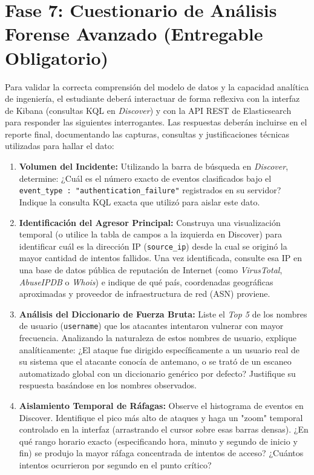 \documentclass[
  coursetitle={Cómputo Nube y Tecnologías Emergentes},
  coursehours={96},
  coursedate={Verano 2026},
  doctype={Práctica},
  otherlangs={english,french},
  authorname={Lázaro},
  authorsurname={Bustio-Martínez},
  authortitle={PhD},
  role={Profesor Investigador},
  email={lbustio@inaoe.mx},
  phone={5559504000},
  ext={7459},
  institution={Instituto Nacional de Astrofísica, Óptica y Electrónica (INAOE)},
  department={Maestría en Ciencias en Tecnologías de Seguridad},
  address={Luis Enrique Erro 1, Sta. Ma. Tonantzintla, San Andrés Cholula, CP 72840, Puebla, México},
  margin={0.5in}
]{../../lbustio_lecture_notes}
\begin{document}
\section{Fase 7: Cuestionario de Análisis Forense Avanzado (Entregable Obligatorio)}

Para validar la correcta comprensión del modelo de datos y la capacidad analítica de ingeniería, el estudiante deberá interactuar de forma reflexiva con la interfaz de Kibana (consultas KQL en \textit{Discover}) y con la API REST de Elasticsearch para responder las siguientes interrogantes. Las respuestas deberán incluirse en el reporte final, documentando las capturas, consultas y justificaciones técnicas utilizadas para hallar el dato:

\begin{enumerate}
    \item \textbf{Volumen del Incidente:} Utilizando la barra de búsqueda en \textit{Discover}, determine: ¿Cuál es el número exacto de eventos clasificados bajo el \texttt{event\_type : "authentication\_failure"} registrados en su servidor? Indique la consulta KQL exacta que utilizó para aislar este dato.
    
    \item \textbf{Identificación del Agresor Principal:} Construya una visualización temporal (o utilice la tabla de campos a la izquierda en Discover) para identificar cuál es la dirección IP (\texttt{source\_ip}) desde la cual se originó la mayor cantidad de intentos fallidos. Una vez identificada, consulte esa IP en una base de datos pública de reputación de Internet (como \textit{VirusTotal}, \textit{AbuseIPDB} o \textit{Whois}) e indique de qué país, coordenadas geográficas aproximadas y proveedor de infraestructura de red (ASN) proviene.
    
    \item \textbf{Análisis del Diccionario de Fuerza Bruta:} Liste el \textit{Top 5} de los nombres de usuario (\texttt{username}) que los atacantes intentaron vulnerar con mayor frecuencia. Analizando la naturaleza de estos nombres de usuario, explique analíticamente: ¿El ataque fue dirigido específicamente a un usuario real de su sistema que el atacante conocía de antemano, o se trató de un escaneo automatizado global con un diccionario genérico por defecto? Justifique su respuesta basándose en los nombres observados.
    
    \item \textbf{Aislamiento Temporal de Ráfagas:} Observe el histograma de eventos en Discover. Identifique el pico más alto de ataques y haga un "zoom" temporal controlado en la interfaz (arrastrando el cursor sobre esas barras densas). ¿En qué rango horario exacto (especificando hora, minuto y segundo de inicio y fin) se produjo la mayor ráfaga concentrada de intentos de acceso? ¿Cuántos intentos ocurrieron por segundo en el punto crítico?
    

\end{enumerate}
\end{document}
